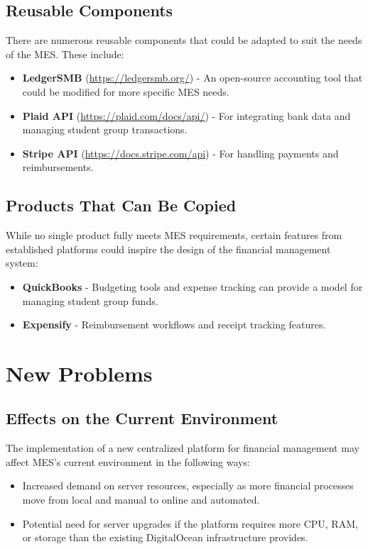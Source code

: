 \documentclass[12pt]{article}
\begin{document}
\subsection{Reusable Components}
There are numerous reusable components that could be adapted to suit the needs of the MES. These include:
\begin{itemize}
    \item \textbf{LedgerSMB} (\href{https://ledgersmb.org/}{https://ledgersmb.org/}) - An open-source accounting tool that could be modified for more specific MES needs.
    \item \textbf{Plaid API} (\href{https://plaid.com/docs/api/}{https://plaid.com/docs/api/}) - For integrating bank data and managing student group transactions.
    \item \textbf{Stripe API} (\href{https://docs.stripe.com/api}{https://docs.stripe.com/api}) - For handling payments and reimbursements.
\end{itemize}

\subsection{Products That Can Be Copied}
While no single product fully meets MES requirements, certain features from established platforms could inspire the design of the financial management system:
\begin{itemize}
    \item \textbf{QuickBooks} - Budgeting tools and expense tracking can provide a model for managing student group funds.
    \item \textbf{Expensify} - Reimbursement workflows and receipt tracking features.
\end{itemize}

\section{New Problems}
\subsection{Effects on the Current Environment}
The implementation of a new centralized platform for financial management may affect MES's current environment in the following ways:
\begin{itemize}
    \item Increased demand on server resources, especially as more financial processes move from local and manual to online and automated.
    \item Potential need for server upgrades if the platform requires more CPU, RAM, or storage than the existing DigitalOcean infrastructure provides.
\end{itemize}
\end{document}
